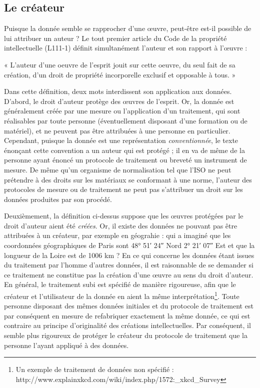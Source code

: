\subsection{Le créateur}

Puisque la donnée semble se rapprocher d'une œuvre, peut-être est-il
possible de lui attribuer un auteur ? Le tout premier article du Code
de la propriété intellectuelle (L111-1) définit simultanément l'auteur
et son rapport à l'œuvre :

« L'auteur d'une oeuvre de l'esprit jouit sur cette oeuvre, du seul
fait de sa création, d'un droit de propriété incorporelle exclusif et
opposable à tous. »

Dans cette définition, deux mots interdissent son application aux
données.  D'abord, le droit d'auteur protège des œuvres de
l'esprit. Or, la donnée est généralement créée par une mesure ou
l'application d'un traitement, qui sont réalisables par toute personne
(éventuellement disposant d'une formation ou de matériel), et ne
peuvent pas être attribuées à une personne en particulier. Cependant,
puisque la donnée est une représentation \emph{conventionnée}, le
texte énonçant cette convention a un auteur qui est protégé ; il en va
de même de la personne ayant énoncé un protocole de traitement ou
breveté un instrument de mesure. De même qu'un organisme de
normalisation tel que l'ISO ne peut prétendre à des droits sur les
matériaux se conformant à une norme, l'auteur des protocoles de mesure
ou de traitement ne peut pas s'attribuer un droit sur les données
produites par son procédé.

Deuxièmement, la définition ci-dessus suppose que les œuvres protégées
par le droit d'auteur aient été \emph{créées}. Or, il existe des
données ne pouvant pas être attribuées à un créateur, par exemple en
géograhie : qui a imaginé que les coordonnées géographiques de Paris
sont 48° 51′ 24″ Nord 2° 21′ 07″ Est et que la longueur de la Loire
est de 1006 km ? En ce qui concerne les données étant issues du
traitement par l'homme d'autres données, il est raisonnable de se
demander si ce traitement ne constitue pas la création d'une œuvre au
sens du droit d'auteur. En général, le traitement subi est spécifié de
manière rigoureuse, afin que le créateur et l'utilisateur de la donnée
en aient la même interprétation\footnote{Un exemple de traitement de
  données non spécifié :
  http://www.explainxkcd.com/wiki/index.php/1572:_xkcd_Survey}. Toute
personne disposant des mêmes données initiales et du protocole de
traitement est par conséquent en mesure de refabriquer exactement la
même donnée, ce qui est contraire au principe d'originalité des
créations intellectuelles. Par conséquent, il semble plus rigoureux de
protéger le créateur du protocole de traitement que la personne
l'ayant appliqué à des données.

